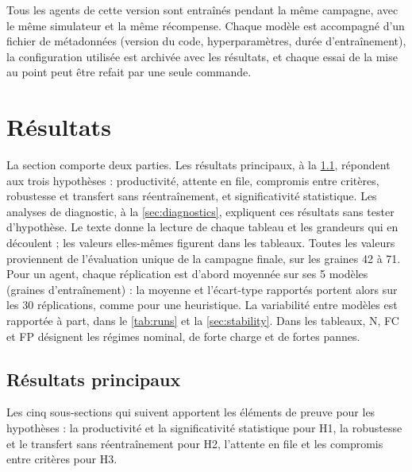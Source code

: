 \documentclass[11pt,a4paper]{article}
\newif\ifrevmarks
\newcommand{\revtag}[1]{\ifrevmarks\textsuperscript{\textcolor{red!70!black}{\scriptsize[#1]}}\fi}
\newcommand{\rev}[2]{\ifrevmarks{\color{revcolor}#2}\revtag{#1}\else#2\fi}
\newenvironment{revbloc}[1]{\par\ifrevmarks\color{revcolor}\noindent\revtag{#1}\ \fi}{\par}
\newif\ifcorrmarks
\newcommand{\corr}[1]{\ifcorrmarks\textcolor{corrcolor}{#1}\else#1\fi}
\newenvironment{corrbloc}{\par\ifcorrmarks\color{corrcolor}\fi}{\par}
\begin{document}
\rev{N11, v3}{Tous les agents de cette version sont entraînés pendant la même campagne, avec le même simulateur et la même récompense. Chaque modèle est accompagné d'un fichier de métadonnées (version du code, hyperparamètres, durée d'entraînement), la configuration utilisée est archivée avec les résultats, et chaque essai de la mise au point peut être refait par une seule commande.}


\section{Résultats}
\label{sec:results}

\begin{revbloc}{T31}
\corr{La section comporte deux parties. Les résultats principaux, à la \cref{sec:main-results}, répondent aux trois hypothèses : productivité, attente en file, compromis entre critères, robustesse et transfert sans réentraînement, et significativité statistique. Les analyses de diagnostic, à la \cref{sec:diagnostics}, expliquent ces résultats sans tester d'hypothèse. Le texte donne la lecture de chaque tableau et les grandeurs qui en découlent ; les valeurs elles-mêmes figurent dans les tableaux.} Toutes les valeurs proviennent de l'évaluation unique de la campagne finale, sur les graines 42 à 71. Pour un agent, chaque réplication est d'abord moyennée sur ses 5 modèles (graines d'entraînement) : la moyenne et l'écart-type rapportés portent alors sur les 30 réplications, comme pour une heuristique. La variabilité entre modèles est rapportée à part, dans le \cref{tab:runs} et la \cref{sec:stability}. Dans les tableaux, N, FC et FP désignent les régimes nominal, de forte charge et de fortes pannes.
\end{revbloc}

\subsection{\corr{Résultats principaux}}
\label{sec:main-results}

\begin{corrbloc}
Les cinq sous-sections qui suivent apportent les éléments de preuve pour les hypothèses : la productivité et la significativité statistique pour H1, la robustesse et le transfert sans réentraînement pour H2, l'attente en file et les compromis entre critères pour H3.
\end{corrbloc}
\end{document}
